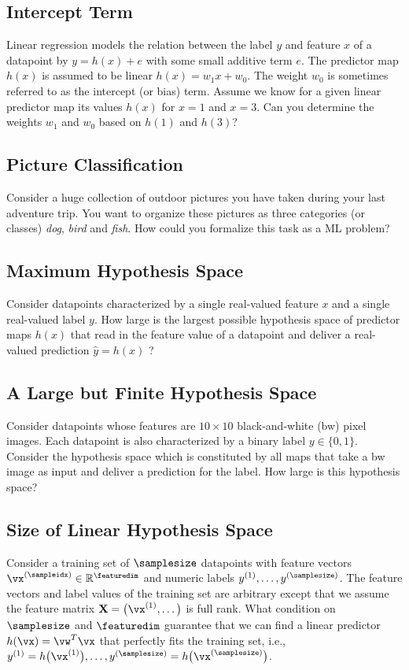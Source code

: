 \documentclass[12pt]{report}
\newcommand{\featurelen}{\featuredim}
\begin{document}
 \subsection{Intercept Term}
 \label{ex_2_5}
 Linear regression models the relation between the label $y$ and feature $x$ of 
 a datapoint by $y = h(x) + e$ with some small additive term $e$. The predictor 
 map $h(x)$ is assumed to be linear $h(x) =w_1 x + w_0$. The weight $w_{0}$ is 
 sometimes referred to as the intercept (or bias) term. Assume we know for a given 
 linear predictor map its values $h(x)$ for $x=1$ and $x=3$. Can you determine 
 the weights $w_{1}$ and $w_{0}$ based on $h(1)$ and $h(3)$?
 
 \subsection{Picture Classification} 
 \label{ex_2_6}
Consider a huge collection of outdoor pictures 
you have taken during your last adventure 
trip. You want to organize these pictures as 
three categories (or classes) \emph{dog}, 
\emph{bird} and \emph{fish}. How could you  
formalize this task as a ML problem? 

 \subsection{Maximum Hypothesis Space} 
\label{ex_2_7}
Consider datapoints characterized by a single real-valued 
feature $x$ and a single real-valued label $y$. How large 
is the largest possible hypothesis space of predictor maps 
$h(x)$ that read in the feature value of a datapoint and 
deliver a real-valued prediction $\hat{y}=h(x)$ ? 

 \subsection{A Large but Finite Hypothesis Space} 
\label{ex_2_8}
Consider datapoints whose features are $10 \times 10$ 
black-and-white (bw) pixel images. Each datapoint is also 
characterized by a binary label $y \in \{0,1\}$. Consider the 
hypothesis space which is constituted by all maps that take 
a bw image as input and deliver a prediction for the label. 
How large is this hypothesis space? 

\subsection{Size of Linear Hypothesis Space} 
\label{ex_size_lin_hypospace} 
Consider a training set of $\samplesize$ datapoints with feature 
vectors $\vx^{(\sampleidx)} \in \mathbb{R}^{\featuredim}$ and 
numeric labels $y^{(1)},\ldots,y^{(\samplesize)}$. The feature vectors 
and label values of the training set are arbitrary except that we assume 
the feature matrix $\mathbf{X} = \big(\vx^{(1)},\ldots \big)$ is full rank. 
What condition on $\samplesize$ and $\featurelen$ guarantee that we 
can find a linear predictor $h(\vx) = \vw^{T} \vx$ that perfectly fits the 
training set, i.e., $y^{(1)} = h\big(\vx^{(1)} \big),\ldots, y^{(\samplesize)} = h\big(\vx^{(\samplesize)} \big)$. 
\end{document}

